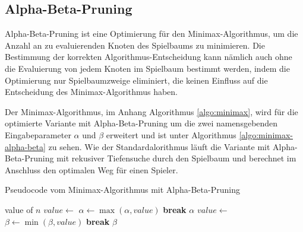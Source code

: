 \subsection{Alpha-Beta-Pruning}

Alpha-Beta-Pruning ist eine Optimierung für den Minimax-Algorithmus, um die Anzahl an zu evaluierenden Knoten des Spielbaums zu minimieren. Die Bestimmung der korrekten Algorithmus-Entscheidung kann nämlich auch ohne die Evaluierung von jedem Knoten im Spielbaum bestimmt werden, indem die Optimierung nur Spielbaumzweige eliminiert, die keinen Einfluss auf die Entscheidung des Minimax-Algorithmus haben. \cite{AlgorithmsAlphaBetaPruning}

Der Minimax-Algorithmus, im Anhang Algorithmus \ref{algo:minimax}, wird für die optimierte Variante mit Alpha-Beta-Pruning um die zwei namensgebenden Eingabeparameter $\alpha$ und $\beta$ erweitert und ist unter Algorithmus \ref{algo:minimax-alpha-beta} zu sehen. Wie der Standardalorithmus läuft die Variante mit Alpha-Beta-Pruning mit rekusiver Tiefensuche durch den Spielbaum und berechnet im Anschluss den optimalen Weg für einen Spieler.


\begin{algorithm}
    \caption{Pseudocode vom Minimax-Algorithmus mit Alpha-Beta-Pruning}
    \label{algo:minimax-alpha-beta}
    \begin{algorithmic}[1]
                \State \Return value of $n$
                    \State $value \gets$ 
                    \State $\alpha \gets \max(\alpha, value)$
                    \If{$\alpha \geq \beta$}
                        \State \textbf{break} 
                    \EndIf
                \EndFor
                \State \Return $\alpha$
                    \State $value \gets$ 
                    \State $\beta \gets \min(\beta, value)$
                    \If{$\beta \leq \alpha$}
                        \State \textbf{break} 
                    \EndIf
                \EndFor
                \State \Return $\beta$
            \EndIf
        \EndFunction
    \end{algorithmic}
\end{algorithm}

